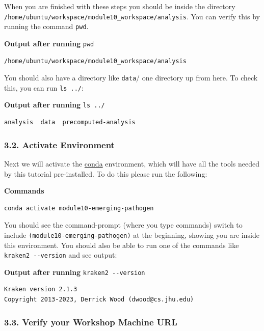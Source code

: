 \documentclass[
]{book}
\begin{document}
When you are finished with these steps you should be inside the directory \texttt{/home/ubuntu/workspace/module10\_workspace/analysis}. You can verify this by running the command \texttt{pwd}.

\textbf{Output after running} \texttt{pwd}

\begin{verbatim}
/home/ubuntu/workspace/module10_workspace/analysis
\end{verbatim}

You should also have a directory like \texttt{data}/ one directory up from here. To check this, you can run \texttt{ls\ ../}:

\textbf{Output after running} \texttt{ls\ ../}

\begin{verbatim}
analysis  data  precomputed-analysis
\end{verbatim}

\subsubsection{3.2. Activate Environment}\label{activate-environment-1}

Next we will activate the \href{https://docs.conda.io/en/latest/}{conda} environment, which will have all the tools needed by this tutorial pre-installed. To do this please run the following:

\textbf{Commands}

\begin{verbatim}
conda activate module10-emerging-pathogen
\end{verbatim}

You should see the command-prompt (where you type commands) switch to include \texttt{(module10-emerging-pathogen)} at the beginning, showing you are inside this environment. You should also be able to run one of the commands like \texttt{kraken2\ -\/-version} and see output:

\textbf{Output after running} \texttt{kraken2\ -\/-version}

\begin{verbatim}
Kraken version 2.1.3
Copyright 2013-2023, Derrick Wood (dwood@cs.jhu.edu)
\end{verbatim}

\subsubsection{3.3. Verify your Workshop Machine URL}\label{verify-your-workshop-machine-url}
\end{document}
